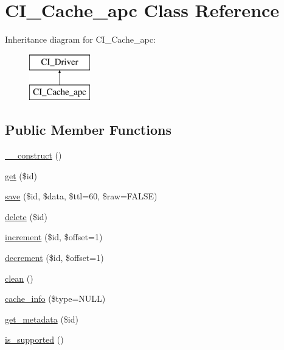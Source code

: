 \hypertarget{class_c_i___cache__apc}{}\section{C\+I\+\_\+\+Cache\+\_\+apc Class Reference}
\label{class_c_i___cache__apc}
Inheritance diagram for C\+I\+\_\+\+Cache\+\_\+apc\+:\begin{figure}[H]
\begin{center}
\leavevmode
\includegraphics[height=2.000000cm]{class_c_i___cache__apc}
\end{center}
\end{figure}
\subsection*{Public Member Functions}
\begin{DoxyCompactItemize}
\item 
\mbox{\hyperlink{class_c_i___cache__apc_a095c5d389db211932136b53f25f39685}{\+\_\+\+\_\+construct}} ()
\item 
\mbox{\hyperlink{class_c_i___cache__apc_a50e3bfb586b2f42932a6a93f3fbb0828}{get}} (\$id)
\item 
\mbox{\hyperlink{class_c_i___cache__apc_a472645db04a8ce4b040b789a3062a7d2}{save}} (\$id, \$data, \$ttl=60, \$raw=F\+A\+L\+SE)
\item 
\mbox{\hyperlink{class_c_i___cache__apc_a2f8258add505482d7f00ea26493a5723}{delete}} (\$id)
\item 
\mbox{\hyperlink{class_c_i___cache__apc_a2f07a4e09b57f4460d49852497d1808f}{increment}} (\$id, \$offset=1)
\item 
\mbox{\hyperlink{class_c_i___cache__apc_a4eb1c2772c8efc48c411ea060dd040b7}{decrement}} (\$id, \$offset=1)
\item 
\mbox{\hyperlink{class_c_i___cache__apc_adb40b812890a8bc058bf6b7a0e1a54d9}{clean}} ()
\item 
\mbox{\hyperlink{class_c_i___cache__apc_aa8b9c4d9f0387156736ccd8850f0727e}{cache\+\_\+info}} (\$type=N\+U\+LL)
\item 
\mbox{\hyperlink{class_c_i___cache__apc_a59635cf18e997c5141bffa05ff7622e0}{get\+\_\+metadata}} (\$id)
\item 
\mbox{\hyperlink{class_c_i___cache__apc_a98c68fd153468bc148c4ed8c716859fc}{is\+\_\+supported}} ()
\end{DoxyCompactItemize}
